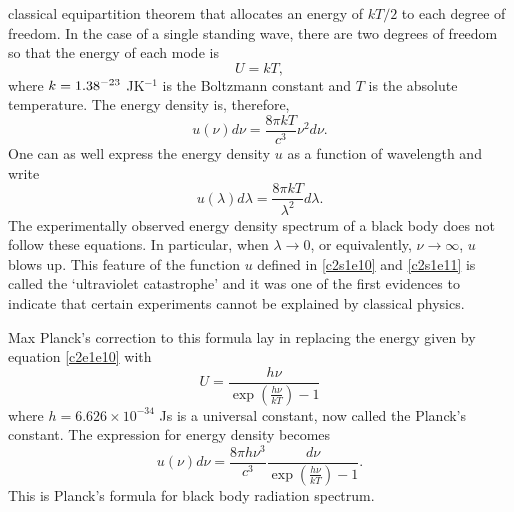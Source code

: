 classical equipartition theorem that allocates an energy of $kT/2$ to each
degree of freedom. In the case of a single standing wave, there are two degrees
of freedom so that the energy of each mode is
\begin{equation}\label{c2s1e10}
U = kT,
\end{equation}
where $k = 1.38 \time 10^{-23}$ JK${}^{-1}$ is the Boltzmann constant and $T$
is the absolute temperature. The energy density is, therefore,
\begin{equation}\label{c2s1e11}
u(\nu)d\nu = \frac{8\pi kT}{c^3}\nu^2 d\nu.
\end{equation}
One can as well express the energy density $u$ as a function of wavelength and
write
\begin{equation}\label{c2s1e12}
u(\lambda)d\lambda = \frac{8\pi kT}{\lambda^2}d\lambda.
\end{equation}
The experimentally observed energy density spectrum of a black body does not
follow these equations. In particular, when $\lambda \rightarrow 0$, or 
equivalently, $\nu \rightarrow \infty$, $u$ blows up. This feature of the 
function $u$ defined in \eqref{c2s1e10} and \eqref{c2s1e11} is called the
`ultraviolet catastrophe' and it was one of the first evidences to indicate 
that certain experiments cannot be explained by classical physics.

Max Planck's correction to this formula lay in replacing the energy given by
equation \eqref{c2e1e10} with
\begin{equation}\label{c2s1e13}
U = \frac{h\nu}{\exp(\frac{h\nu}{kT}) - 1}
\end{equation}
where $h = 6.626 \times 10^{-34}$ Js is a universal constant, now called the
Planck's constant. The expression for energy density becomes
\begin{equation}\label{c2s1e14}
u(\nu)d\nu = \frac{8\pi h\nu^3}{c^3}\frac{d\nu}{\exp(\frac{h\nu}{kT}) - 1}.
\end{equation}
This is Planck's formula for black body radiation spectrum. 

